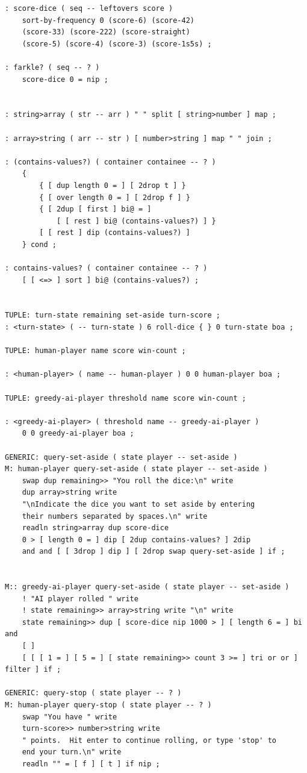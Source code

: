 \documentclass{article}
\begin{document}
\begin{verbatim}
: score-dice ( seq -- leftovers score )
    sort-by-frequency 0 (score-6) (score-42)
    (score-33) (score-222) (score-straight)
    (score-5) (score-4) (score-3) (score-1s5s) ;

: farkle? ( seq -- ? )
    score-dice 0 = nip ;


: string>array ( str -- arr ) " " split [ string>number ] map ;

: array>string ( arr -- str ) [ number>string ] map " " join ;

: (contains-values?) ( container containee -- ? )
    {
        { [ dup length 0 = ] [ 2drop t ] }
        { [ over length 0 = ] [ 2drop f ] }
        { [ 2dup [ first ] bi@ = ] 
            [ [ rest ] bi@ (contains-values?) ] }
        [ [ rest ] dip (contains-values?) ] 
    } cond ;

: contains-values? ( container containee -- ? ) 
    [ [ <=> ] sort ] bi@ (contains-values?) ;


TUPLE: turn-state remaining set-aside turn-score ;
: <turn-state> ( -- turn-state ) 6 roll-dice { } 0 turn-state boa ;

TUPLE: human-player name score win-count ;

: <human-player> ( name -- human-player ) 0 0 human-player boa ;

TUPLE: greedy-ai-player threshold name score win-count ;

: <greedy-ai-player> ( threshold name -- greedy-ai-player )
    0 0 greedy-ai-player boa ;

GENERIC: query-set-aside ( state player -- set-aside )
M: human-player query-set-aside ( state player -- set-aside )
    swap dup remaining>> "You roll the dice:\n" write
    dup array>string write
    "\nIndicate the dice you want to set aside by entering
    their numbers separated by spaces.\n" write
    readln string>array dup score-dice
    0 > [ length 0 = ] dip [ 2dup contains-values? ] 2dip
    and and [ [ 3drop ] dip ] [ 2drop swap query-set-aside ] if ;


M:: greedy-ai-player query-set-aside ( state player -- set-aside )
    ! "AI player rolled " write
    ! state remaining>> array>string write "\n" write
    state remaining>> dup [ score-dice nip 1000 > ] [ length 6 = ] bi and
    [ ]
    [ [ [ 1 = ] [ 5 = ] [ state remaining>> count 3 >= ] tri or or ] filter ] if ;

GENERIC: query-stop ( state player -- ? )
M: human-player query-stop ( state player -- ? )
    swap "You have " write
    turn-score>> number>string write
    " points.  Hit enter to continue rolling, or type 'stop' to
    end your turn.\n" write
    readln "" = [ f ] [ t ] if nip ;


\end{verbatim}
\end{document}
